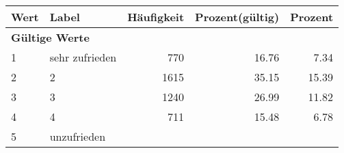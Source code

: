      \begin{longtable}{lXrrr}
     \toprule
     \textbf{Wert} & \textbf{Label} & \textbf{Häufigkeit} & \textbf{Prozent(gültig)} & \textbf{Prozent} \\
     \endhead
     \midrule
     \multicolumn{5}{l}{\textbf{Gültige Werte}}\\

     1 &
     \multicolumn{1}{X}{ sehr zufrieden   } &


       \num{770} &
       \num[round-mode=places,round-precision=2]{16,76} &
         \num[round-mode=places,round-precision=2]{7,34} \\

     2 &
     \multicolumn{1}{X}{ 2   } &


       \num{1615} &
       \num[round-mode=places,round-precision=2]{35,15} &
         \num[round-mode=places,round-precision=2]{15,39} \\

     3 &
     \multicolumn{1}{X}{ 3   } &


       \num{1240} &
       \num[round-mode=places,round-precision=2]{26,99} &
         \num[round-mode=places,round-precision=2]{11,82} \\

     4 &
     \multicolumn{1}{X}{ 4   } &


       \num{711} &
       \num[round-mode=places,round-precision=2]{15,48} &
         \num[round-mode=places,round-precision=2]{6,78} \\

     5 &
     \multicolumn{1}{X}{ unzufrieden   } &



\end{longtable}
